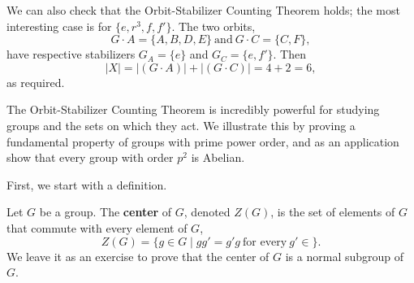 \documentclass[math1530-lecture-notes]{subfiles}
\begin{document}
\begin{example}
  We can also check that the Orbit-Stabilizer Counting Theorem holds; the most interesting case is
  for $\{ e,r^3,f,f' \}$. The two orbits, \[
    G\cdot A=\{ A,B,D,E \} ~\text{and}~G\cdot C=\{ C,F \}
  ,\] have respective stabilizers $G_A=\{ e \}$ and $G_C=\{ e,f' \}$. Then \[
  \left| X \right| =\left| (G\cdot A) \right| +\left| (G\cdot C) \right| =4+2=6
  ,\] as required.
\end{example}

The Orbit-Stabilizer Counting Theorem is incredibly powerful for studying groups and the sets on
which they act. We illustrate this by proving a fundamental property of groups with prime power
order, and as an application show that every group with order $p^2$ is Abelian.

First, we start with a definition.
\begin{definition}[Center]{}
  Let $G$ be a group. The \textbf{center} of $G$, denoted $Z(G)$, is the set of elements of $G$ that
  commute with every element of $G$, \[
    Z(G)=\{g\in G\mid gg'=g'g ~\text{for every}~g'\in  \} 
  .\] We leave it as an exercise to prove that the center of $G$ is a normal subgroup of $G$.
\end{definition}
\end{document}
